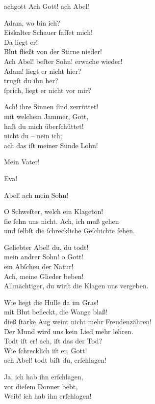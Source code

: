\documentclass[tocstyle=ref-genre]{ees}
\begin{document}
{\begin{movement}{achgott}
  \voice[Adam]
  Ach Gott! ach Abel!

  \voice[Eva]
  Adam, wo bin ich?\\
  Eiskalter Schauer faſſet mich!\\
  Da liegt er!\\
  Blut fließt von der Stirne nieder!\\
  Ach Abel! beſter Sohn! erwache wieder!\\
  Adam! liegt er nicht hier?\\
  trugſt du ihn her?\\
  ſprich, liegt er nicht vor mir?

  \voice[Adam]
  Ach! ihre Sinnen ſind zerrüttet!\\
  mit welchem Jammer, Gott,\\
  haſt du mich überſchüttet!\\
  nicht du – nein ich;\\
  ach das iſt meiner Sünde Lohn!

  \voice[Thirza]
  Mein Vater!

  \voice[Mehala]
  Eva!

  \voice[Eva]
  Abel! ach mein Sohn!

  \voice[Thirza]
  O Schweſter, welch ein Klageton!\\
  ſie ſehn uns nicht. Ach, ich muß gehen\\
  und ſelbſt die ſchreckliche Geſchichte ſehen.

  \voice[Adam]
  Geliebter Abel! du, du todt!\\
  mein andrer Sohn! o Gott!\\
  ein Abſcheu der Natur!\\
  Ach, meine Glieder beben!\\
  Allmächtiger, du wirſt die Klagen uns vergeben.

  \voice[Eva]
  Wie liegt die Hülle da im Gras!\\
  mit Blut befleckt, die Wange blaß!\\
  dieß ſtarke Aug weint nicht mehr Freudenzähren!\\
  Der Mund wird uns kein Lied mehr lehren.\\
  Todt iſt er! ach, iſt das der Tod?\\
  Wie ſchrecklich iſt er, Gott!\\
  ach Abel! todt biſt du, erſchlagen!

  \voice[Kain]
  Ja, ich hab ihn erſchlagen,\\
  vor dieſem Donner bebt,\\
  Weib! ich hab ihn erſchlagen!
\end{movement}

}
\end{document}
